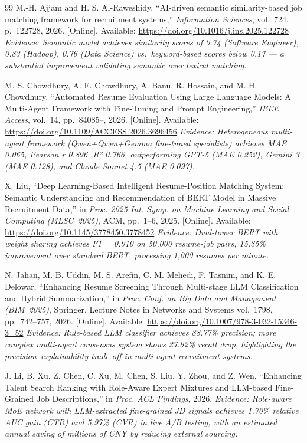 \documentclass[journal]{IEEEtran}
\begin{document}
\begin{thebibliography}{99}
M.-H. Ajjam and H. S. Al-Raweshidy,
``AI-driven semantic similarity-based job matching framework for recruitment
systems,''
\textit{Information Sciences}, vol.~724, p.~122728, 2026.
[Online]. Available: \url{https://doi.org/10.1016/j.ins.2025.122728}
\textit{Evidence: Semantic model achieves similarity scores of 0.74 (Software
Engineer), 0.83 (Hadoop), 0.76 (Data Science) vs.\ keyword-based scores below
0.17 — a substantial improvement validating semantic over lexical matching.}

M. S. Chowdhury, A. F. Chowdhury, A. Banu, R. Hossain, and M. H. Chowdhury,
``Automated Resume Evaluation Using Large Language Models: A Multi-Agent
Framework with Fine-Tuning and Prompt Engineering,''
\textit{IEEE Access}, vol.~14, pp.~84085--, 2026.
[Online]. Available: \url{https://doi.org/10.1109/ACCESS.2026.3696456}
\textit{Evidence: Heterogeneous multi-agent framework (Qwen+Qwen+Gemma fine-tuned
specialists) achieves MAE 0.065, Pearson r 0.896, R² 0.766, outperforming GPT-5
(MAE 0.252), Gemini 3 (MAE 0.128), and Claude Sonnet 4.5 (MAE 0.097).}

X. Liu,
``Deep Learning-Based Intelligent Resume-Position Matching System: Semantic
Understanding and Recommendation of BERT Model in Massive Recruitment Data,''
in \textit{Proc. 2025 Int. Symp. on Machine Learning and Social Computing
(MLSC~2025)}, ACM, pp.~1--6, 2025.
[Online]. Available: \url{https://doi.org/10.1145/3778450.3778452}
\textit{Evidence: Dual-tower BERT with weight sharing achieves F1 = 0.910 on
50,000 resume-job pairs, 15.85\% improvement over standard BERT, processing
1,000 resumes per minute.}

N. Jahan, M. B. Uddin, M. S. Arefin, C. M. Mehedi, F. Tasnim, and
K. E. Delowar,
``Enhancing Resume Screening Through Multi-stage LLM Classification and
Hybrid Summarization,''
in \textit{Proc. Conf. on Big Data and Management (BIM~2025)}, Springer,
Lecture Notes in Networks and Systems vol.~1798, pp.~742--757, 2026.
[Online]. Available: \url{https://doi.org/10.1007/978-3-032-15346-3_52}
\textit{Evidence: Rule-based LLM classifier achieves 88.77\% precision; more
complex multi-agent consensus system shows 27.92\% recall drop, highlighting the
precision–explainability trade-off in multi-agent recruitment systems.}

J. Li, B. Xu, Z. Chen, C. Xu, M. Chen, S. Liu, Y. Zhou, and Z. Wen,
``Enhancing Talent Search Ranking with Role-Aware Expert Mixtures and
LLM-based Fine-Grained Job Descriptions,''
in \textit{Proc. ACL Findings}, 2026.
\textit{Evidence: Role-aware MoE network with LLM-extracted fine-grained JD
signals achieves 1.70\% relative AUC gain (CTR) and 5.97\% (CVR) in live A/B
testing, with an estimated annual saving of millions of CNY by reducing external
sourcing.}


\end{thebibliography}
\end{document}
